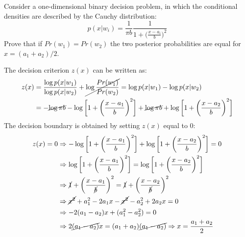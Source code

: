 \Exercise[number={8}]
Consider a one-dimensional binary decision problem, in which the conditional
densities are described by the Cauchy distribution:
\[
    p(x|w_i)=\frac{1}{\pi b}\frac{1}{1+\bigl(\frac{x-a_i}{b}\bigr)^2}
\]
Prove that if \(Pr(w_1)=Pr(w_2)\) the two posterior probabilities are equal
for \(x=(a_1+a_2)/2\).

\Answer[number={8}]
The decision criterion \(z(x)\) can be written as:
\begin{align*}
    z(x)
    &=\frac{\log{p(x|w_1)}}{\log{p(x|w_2)}}+\cancel{\log{\frac{Pr(w_1)}{Pr(w_2)}}}
    =\log{p(x|w_1)}-\log{p(x|w_2)}\\
    &=-\cancel{\log{\pi b}}-\log{\biggl[1+\biggl(\frac{x-a_1}{b}\biggr)^2\biggr]}+\cancel{\log{\pi b}}+\log{\biggl[1+\biggl(\frac{x-a_2}{b}\biggr)^2\biggr]}
\end{align*}
The decision boundary is obtained by setting \(z(x)\) equal to 0:
\begin{align*}
    z(x)=0
    &\Rightarrow
    -\log{\biggl[1+\biggl(\frac{x-a_1}{b}\biggr)^2\biggr]}+\log{\biggl[1+\biggl(\frac{x-a_2}{b}\biggr)^2\biggr]}=0\\
    &\Rightarrow
    \log{\biggl[1+\biggl(\frac{x-a_1}{b}\biggr)^2\biggr]}=\log{\biggl[1+\biggl(\frac{x-a_2}{b}\biggr)^2\biggr]}\\
    &\Rightarrow
    \cancel{1}+\biggl(\frac{x-a_1}{\cancel{b}}\biggr)^2=\cancel{1}+\biggl(\frac{x-a_2}{\cancel{b}}\biggr)^2\\
    &\Rightarrow
    \cancel{x^2}+a_1^2-2a_1x-\cancel{x^2}-a_2^2+2a_2x=0\\
    &\Rightarrow
    -2(a_1-a_2)x+(a_1^2-a_2^2)=0\\
    &\Rightarrow
    2\cancel{(a_1-a_2)}x=(a_1+a_2)\cancel{(a_1-a_2)}
    \Rightarrow
    x=\frac{a_1+a_2}{2}
\end{align*}